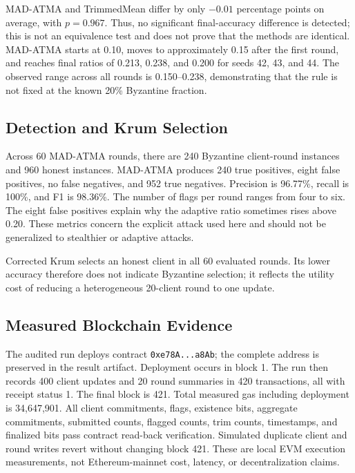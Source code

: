 \documentclass[10pt,letterpaper]{article}
\begin{document}
MAD-ATMA and TrimmedMean differ by only $-0.01$ percentage points on average,
with $p=0.967$. Thus, no significant final-accuracy difference is detected;
this is not an equivalence test and does not prove that the methods are
identical. MAD-ATMA starts at 0.10, moves to approximately 0.15 after the first
round, and reaches final ratios of 0.213, 0.238, and 0.200 for seeds 42, 43, and
44. The observed range across all rounds is 0.150--0.238, demonstrating that
the rule is not fixed at the known 20\% Byzantine fraction.

\subsection{Detection and Krum Selection}

Across 60 MAD-ATMA rounds, there are 240 Byzantine client-round instances and
960 honest instances. MAD-ATMA produces 240 true positives, eight false
positives, no false negatives, and 952 true negatives. Precision is 96.77\%,
recall is 100\%, and F1 is 98.36\%. The number of flags per round ranges from
four to six. The eight false positives explain why the adaptive ratio sometimes
rises above 0.20. These metrics concern the explicit attack used here and
should not be generalized to stealthier or adaptive attacks.

Corrected Krum selects an honest client in all 60 evaluated rounds. Its lower
accuracy therefore does not indicate Byzantine selection; it reflects the
utility cost of reducing a heterogeneous 20-client round to one update.

\subsection{Measured Blockchain Evidence}



The audited run deploys contract \texttt{0xe78A...a8Ab}; the complete address
is preserved in the result artifact. Deployment occurs in block 1.
The run then records 400 client updates and 20 round summaries in 420
transactions, all with receipt status 1. The final block is 421. Total measured
gas including deployment is 34,647,901. All client commitments, flags, existence
bits, aggregate commitments, submitted counts, flagged counts, trim counts,
timestamps, and finalized bits pass contract read-back verification. Simulated
duplicate client and round writes revert without changing block 421. These are
local EVM execution measurements, not Ethereum-mainnet cost, latency, or
decentralization claims.
\end{document}
